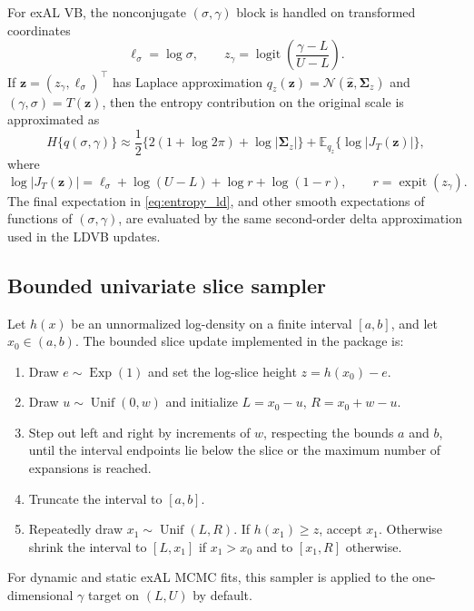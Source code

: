 \documentclass[nojss,noheadings]{jss}
\renewcommand{\E}{\mathbb{E}}
\newcommand{\logit}{\operatorname{logit}}
\newcommand{\expit}{\operatorname{expit}}
\newcommand{\vect}[1]{\bm{#1}}
\newcommand{\mat}[1]{\mathbf{#1}}
\newcommand{\N}{\mathcal{N}}
\newcommand{\Exp}{\operatorname{Exp}}
\begin{document}
For exAL VB, the nonconjugate $(\sigma,\gamma)$ block is handled on
transformed coordinates
\begin{equation}
\ell_\sigma=\log\sigma,\qquad
z_\gamma=\logit\left(\frac{\gamma-L}{U-L}\right).
\end{equation}
If $\vect{z}=(z_\gamma,\ell_\sigma)^\top$ has Laplace approximation
$q_z(\vect{z})=\N(\hat{\vect{z}},\mat{\Sigma}_z)$ and
$(\gamma,\sigma)=T(\vect{z})$, then the entropy contribution on the original
scale is approximated as
\begin{equation}
H\{q(\sigma,\gamma)\}
\approx
\frac{1}{2}\{2(1+\log 2\pi)+\log|\mat{\Sigma}_z|\}
+\E_{q_z}\{\log|J_T(\vect{z})|\},
\label{eq:entropy_ld}
\end{equation}
where
\begin{equation}
\log|J_T(\vect{z})|
=\ell_\sigma+\log(U-L)+\log r+\log(1-r),
\qquad r=\expit(z_\gamma).
\end{equation}
The final expectation in \eqref{eq:entropy_ld}, and other smooth expectations
of functions of $(\sigma,\gamma)$, are evaluated by the same second-order
delta approximation used in the LDVB updates.

\subsection{Bounded univariate slice sampler}
\label{sec:slice}

Let $h(x)$ be an unnormalized log-density on a finite interval $[a,b]$, and let
$x_0\in(a,b)$. The bounded slice update implemented in the package is:
\begin{enumerate}[label=(\arabic*)]
\item Draw $e\sim\Exp(1)$ and set the log-slice height $z=h(x_0)-e$.
\item Draw $u\sim\operatorname{Unif}(0,w)$ and initialize
$L=x_0-u$, $R=x_0+w-u$.
\item Step out left and right by increments of $w$, respecting the bounds
$a$ and $b$, until the interval endpoints lie below the slice or the maximum
number of expansions is reached.
\item Truncate the interval to $[a,b]$.
\item Repeatedly draw $x_1\sim\operatorname{Unif}(L,R)$. If $h(x_1)\ge z$,
accept $x_1$. Otherwise shrink the interval to $[L,x_1]$ if $x_1>x_0$ and to
$[x_1,R]$ otherwise.
\end{enumerate}
For dynamic and static exAL MCMC fits, this sampler is applied to the
one-dimensional $\gamma$ target on $(L,U)$ by default.
\end{document}
